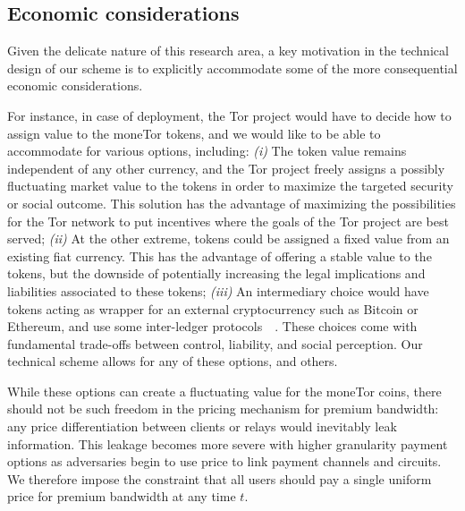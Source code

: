 
\subsection{Economic considerations}



Given the delicate nature of this research area, a key motivation in
the technical design of our scheme is to explicitly accommodate some
of the more consequential economic considerations.

For instance, in case of deployment, the Tor project would have to
decide how to assign value to the moneTor tokens, and we would like to
be able to accommodate for various options, including: \emph{(i)} The
token value remains independent of any other currency, and the Tor
project freely assigns a possibly fluctuating market value to the
tokens in order to maximize the targeted security or social
outcome. This solution has the advantage of maximizing the
possibilities for the Tor network to put incentives where the goals of
the Tor project are best served; \emph{(ii)} At the other extreme,
tokens could be assigned a fixed value from an existing fiat currency.
This has the advantage of offering a stable value to the tokens, but
the downside of potentially increasing the legal implications and
liabilities associated to these tokens; \emph{(iii)} An intermediary
choice would have tokens acting as wrapper for an external
cryptocurrency such as Bitcoin or Ethereum, and use some inter-ledger
protocols~\cite{back2014enabling}~\cite{poon2017plasma}. These choices
come with fundamental trade-offs between control, liability, and
social perception. Our technical scheme allows for any of these
options, and others.

While these options can create a fluctuating value for the
moneTor coins, there should not be such freedom in the pricing
mechanism for premium bandwidth: any price differentiation between
clients or relays would inevitably leak information. This leakage
becomes more severe with higher granularity payment options as
adversaries begin to use price to link payment channels and circuits.
We therefore impose the constraint that all users should pay a single
uniform price for premium bandwidth at any time $t$.

